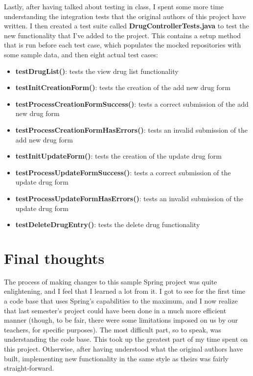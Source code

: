 \documentclass[12pt, a4paper]{article}
\begin{document}
Lastly, after having talked about testing in class, I spent some more time understanding the integration tests that the original authors of this project have written. I then created a test suite called \textbf{DrugControllerTests.java} to test the new functionality that I've added to the project. This contains a setup method that is run before each test case, which populates the mocked repositories with some sample data, and then eight actual test cases:
\begin{itemize}
\item \textbf{testDrugList()}: tests the view drug list functionality
\item \textbf{testInitCreationForm()}: tests the creation of the add new drug form
\item \textbf{testProcessCreationFormSuccess()}: tests a correct submission of the add new drug form
\item \textbf{testProcessCreationFormHasErrors()}: tests an invalid submission of the add new drug form
\item \textbf{testInitUpdateForm()}: tests the creation of the update drug form
\item \textbf{testProcessUpdateFormSuccess()}: tests a correct submission of the update drug form
\item \textbf{testProcessUpdateFormHasErrors()}: tests an invalid submission of the update drug form
\item \textbf{testDeleteDrugEntry()}: tests the delete drug functionality
\end{itemize}

\newpage
\section{Final thoughts}

The process of making changes to this sample Spring project was quite enlightening, and I feel that I learned a lot from it. I got to see for the first time a code base that uses Spring's capabilities to the maximum, and I now realize that last semester's project could have been done in a much more efficient manner (though, to be fair, there were some limitations imposed on us by our teachers, for specific purposes). The most difficult part, so to speak, was understanding the code base. This took up the greatest part of my time spent on this project. Otherwise, after having understood what the original authors have built, implementing new functionality in the same style as theirs was fairly straight-forward.
\end{document}
